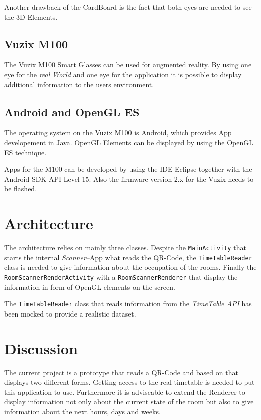 \documentclass[11pt]{scrartcl}
\begin{document}
\begin{multicols}{2}
			Another drawback of the CardBoard is the fact that both eyes are needed to see the 3D Elements.   
		
		\subsection{Vuzix M100}
			The Vuzix M100 Smart Glasses can be used for augmented reality. By using one eye for the \emph{real World} and one eye for the application it is possible to display additional information to the users environment.
		
		\subsection{Android and OpenGL ES}
			The operating system on the Vuzix M100 is Android, which provides App developement in Java. OpenGL Elements can be displayed by using the OpenGL ES technique.
	
			Apps for the M100 can be developed by using the IDE Eclipse together with the Android SDK API-Level 15. Also the firmware version 2.x for the Vuzix needs to be flashed.

	\section{Architecture}
		The architecture relies on mainly three classes. Despite the \texttt{MainActivity} that starts the internal \emph{Scanner}--App what reads the QR-Code, the \texttt{TimeTableReader} class is needed to give information about the occupation of the rooms. Finally the \texttt{RoomScannerRenderActivity} with a \texttt{RoomScannerRenderer} that display the information in form of OpenGL elements on the screen.
		
		The \texttt{TimeTableReader} class that reads information from the \emph{TimeTable API} has been mocked to provide a realistic dataset.
		
	\section{Discussion}
		The current project is a prototype that reads a QR-Code and based on that displays two different forms. Getting access to the real timetable is needed to put this application to use. Furthermore it is adviseable to extend the Renderer to display information not only about the current state of the room but also to give information about the next hours, days and weeks.
		

\end{multicols}
\end{document}
